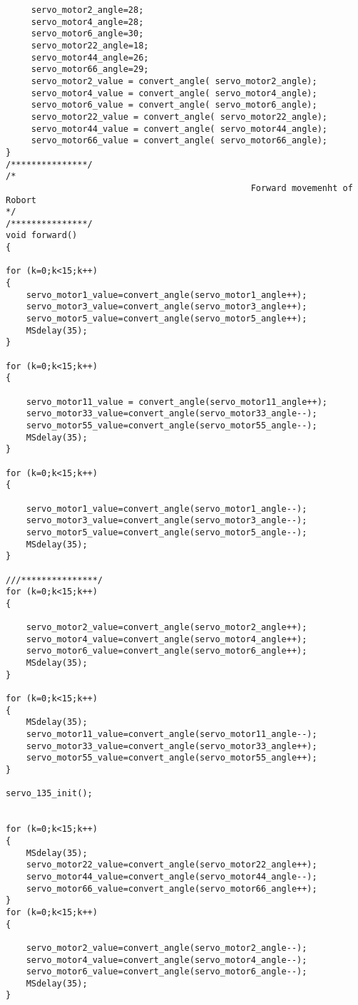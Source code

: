 \documentclass{report}
\begin{document}
\begin{appendices}
\begin{lstlisting}
	 servo_motor2_angle=28;
	 servo_motor4_angle=28;
	 servo_motor6_angle=30;
	 servo_motor22_angle=18;
	 servo_motor44_angle=26;
 	 servo_motor66_angle=29;
	 servo_motor2_value = convert_angle( servo_motor2_angle);
	 servo_motor4_value = convert_angle( servo_motor4_angle);
	 servo_motor6_value = convert_angle( servo_motor6_angle);
	 servo_motor22_value = convert_angle( servo_motor22_angle);
	 servo_motor44_value = convert_angle( servo_motor44_angle);
 	 servo_motor66_value = convert_angle( servo_motor66_angle);
}
/***************/
/*
												Forward movemenht of Robort
*/
/***************/
void forward()
{

for (k=0;k<15;k++)
{
	servo_motor1_value=convert_angle(servo_motor1_angle++);
	servo_motor3_value=convert_angle(servo_motor3_angle++);        
	servo_motor5_value=convert_angle(servo_motor5_angle++);
	MSdelay(35);
}

for (k=0;k<15;k++)
{
	
	servo_motor11_value = convert_angle(servo_motor11_angle++);
	servo_motor33_value=convert_angle(servo_motor33_angle--);
	servo_motor55_value=convert_angle(servo_motor55_angle--);
	MSdelay(35);
}

for (k=0;k<15;k++)
{
	
	servo_motor1_value=convert_angle(servo_motor1_angle--);
	servo_motor3_value=convert_angle(servo_motor3_angle--);
	servo_motor5_value=convert_angle(servo_motor5_angle--);
	MSdelay(35);
}

///***************/
for (k=0;k<15;k++)
{

	servo_motor2_value=convert_angle(servo_motor2_angle++);
	servo_motor4_value=convert_angle(servo_motor4_angle++);
	servo_motor6_value=convert_angle(servo_motor6_angle++);	
	MSdelay(35);
}

for (k=0;k<15;k++)
{
	MSdelay(35);	
	servo_motor11_value=convert_angle(servo_motor11_angle--);
	servo_motor33_value=convert_angle(servo_motor33_angle++);
	servo_motor55_value=convert_angle(servo_motor55_angle++);
}

servo_135_init();


for (k=0;k<15;k++)
{
	MSdelay(35);	
	servo_motor22_value=convert_angle(servo_motor22_angle++);
	servo_motor44_value=convert_angle(servo_motor44_angle--);
	servo_motor66_value=convert_angle(servo_motor66_angle++);
}
for (k=0;k<15;k++)
{
	
	servo_motor2_value=convert_angle(servo_motor2_angle--);
	servo_motor4_value=convert_angle(servo_motor4_angle--);
	servo_motor6_value=convert_angle(servo_motor6_angle--);	
	MSdelay(35);
}



\end{lstlisting}
\end{appendices}
\end{document}
